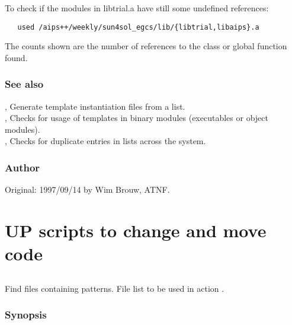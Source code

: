 To check if the modules in libtrial.a have still some undefined references:

\begin{verbatim}
   used /aips++/weekly/sun4sol_egcs/lib/{libtrial,libaips}.a
\end{verbatim}

The counts shown are the number of references to the class or global function
found.

\subsubsection*{See also}

, Generate template instantiation files from a list.\\
, Checks for usage of templates in binary modules (executables
or object modules).\\
, Checks for duplicate entries in  lists
   across the system.

\subsubsection*{Author}

Original: 1997/09/14 by Wim Brouw, ATNF.


\newpage
\section{UP scripts to change and move code}
\label{UPscripts}



\subsection{}
\label{UPfind}

Find files containing patterns. File list to be used in action .

\subsubsection*{Synopsis}

